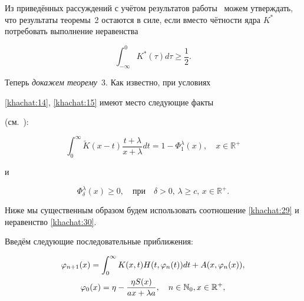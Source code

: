 


\smallskip

\begin{remark}

Из приведённых рассуждений с учётом результатов работы~\cite{popovkoval:bib:Khachatryana} можем утверждать, что результаты теоремы~2 остаются в силе, если вместо чётности ядра $K^*$ потребовать выполнение неравенства

$$

\int _{-\infty}^{0}K^*(\tau)d\tau\geq\frac{1}{2}.

$$

\end{remark}



\smallskip





Теперь \textit{докажем теорему}~3. Как известно, при условиях

\eqref{khachat:14}, \eqref{khachat:15} имеют место следующие факты

(см.~\cite{popovkoval:bib:Khachatryanc}):

\begin{equation}

\int _{0}^{\infty}\tilde{K}(x-t)\frac{t+\lambda}{x+\lambda}dt=1-\Phi_1^{\lambda}(x),\quad

x\in\mathbb{R}^+\label{khachat:29}

\end{equation}

и

\begin{equation}

\Phi_{\delta}^{\lambda}(x)\geq0,\quad \text{при} \quad \delta>0,\,\lambda\geq

c,\,x\in\mathbb{R}^+.\label{khachat:30}

\end{equation}

Ниже мы существенным образом будем использовать соотношение \eqref{khachat:29} и неравенство \eqref{khachat:30}. 

Введём следующие последовательные приближения:

\begin{gather}

\varphi_{n+1}(x)=\int _{0}^{\infty}K(x,t)H(t,\varphi_n(t))dt+A(x,\varphi_n(x)),\label{khachat:31}\\

\varphi_0(x)=\eta-\frac{\eta S(x)}{ax+\lambda a},\quad n\in\mathbb{N}_0,x\in\mathbb{R}^+,\notag

\end{gather}

